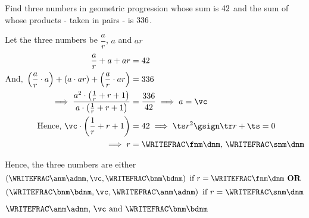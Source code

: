 



\DIVIDE\vb\va\vc
\SQUARE\va\tp
\SUBTRACT\vb\tp\tq
\FRACTIONSIMPLIFY\tq\vb\tr\ts
\QUADEQNROOTS\ts\tr\ts\dnm\fnm\snm
{}\fnm\dnm\anm\adnm
{}\fnm\dnm\bnm\bdnm

\question[3] Find three numbers in geometric progression whose sum is $42$ and the
sum of whose products - taken in pairs - is $336$.

\watchout

\ifprintanswers
\fi 

\begin{solution}[\halfpage]
	Let the three numbers be $\dfrac{a}{r}$, $a$ and $ar$
	\begin{align}
		\dfrac{a}{r} + a + ar &= \va \\
		\text{And, } \left( \dfrac{a}{r}\cdot a\right) + \left( a\cdot ar\right) + 
		\left( \dfrac{a}{r}\cdot ar\right) &= \vb \\
		\implies \dfrac{a^2\cdot\left( \frac{1}{r} + r + 1 \right)}{a\cdot\left( \frac{1}{r} + r + 1\right)}
		&= \dfrac{\vb}{\va} \implies a = \vc \\
		\text{Hence, } \vc\cdot\left( \dfrac{1}{r} + r + 1 \right) &= \va 
    \implies \ts r^2\gsign\tr r + \ts = 0 \\
    \implies r &= \WRITEFRAC\fnm\dnm,\,\WRITEFRAC\snm\dnm
	\end{align}
	
	Hence, the three numbers are either 
    \[ \left( \WRITEFRAC\anm\adnm, \vc, \WRITEFRAC\bnm\bdnm \right)\text{ if } r=\WRITEFRAC\fnm\dnm \textbf{ OR } \]
    \[\left( \WRITEFRAC\bnm\bdnm, \vc, \WRITEFRAC\anm\adnm \right)\text{ if }r=\WRITEFRAC\snm\dnm \]
\end{solution}

\ifprintanswers\begin{codex}$\WRITEFRAC\anm\adnm,\,\vc\text{ and }\WRITEFRAC\bnm\bdnm$\end{codex}\fi
